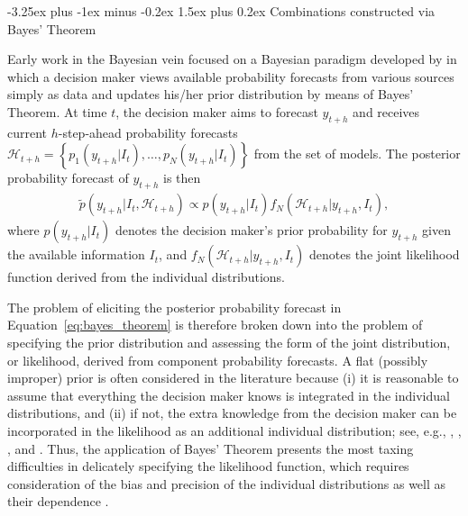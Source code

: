 \documentclass[11pt]{article}
\makeatletter
\renewcommand{\paragraph}{\@startsection{paragraph}{4}{0ex}%
   {-3.25ex plus -1ex minus -0.2ex}%
   {1.5ex plus 0.2ex}%
   {\normalfont\normalsize\bfseries}}
\makeatother
\begin{document}
\paragraph{Combinations constructed via Bayes' Theorem}

Early work in the Bayesian vein focused on a Bayesian paradigm developed by \cite{Morris1974-yh,Morris1977-xl} in which a decision maker views available probability forecasts from various sources simply as data and updates his/her prior distribution by means of Bayes' Theorem. At time $t$, the decision maker aims to forecast $y_{t+h}$ and receives current $h$-step-ahead probability forecasts $\mathcal{H}_{t+h} = \left\{p_{1}(y_{t+h}|I_{t}), \ldots, p_{N}(y_{t+h}|I_{t})\right\}$ from the set of models. The posterior probability forecast of $y_{t+h}$ is then
\begin{align}
\label{eq:bayes_theorem}
\tilde{p}\left(y_{t+h} | I_{t}, \mathcal{H}_{t+h}\right) \propto p\left(y_{t+h} | I_{t}\right) f_{N}\left(\mathcal{H}_{t+h} | y_{t+h}, I_{t}\right),
\end{align}
where $p\left(y_{t+h} | I_{t}\right)$ denotes the decision maker's prior probability for $y_{t+h}$ given the available information $I_{t}$, and $f_{N}\left(\mathcal{H}_{t+h} | y_{t+h}, I_{t}\right)$ denotes the joint likelihood function derived from the individual distributions.

The problem of eliciting the posterior probability forecast in Equation~\eqref{eq:bayes_theorem} is therefore broken down into the problem of specifying the prior distribution and assessing the form of the joint distribution, or likelihood, derived from component probability forecasts. A flat (possibly improper) prior is often considered in the literature because (i) it is reasonable to assume that everything the decision maker knows is integrated in the individual distributions, and (ii) if not, the extra knowledge from the decision maker can be incorporated in the likelihood as an additional individual distribution; see, e.g., \cite{Winkler1968-uw}, \cite{Clemen1993-ty}, \cite{Clemen1985-kx}, and \cite{Jouini1996-fe}. Thus, the application of Bayes' Theorem presents the most taxing difficulties in delicately specifying the likelihood function, which requires consideration of the bias and precision of the individual distributions as well as their dependence \citep{Hall2004-tm}.
\end{document}
